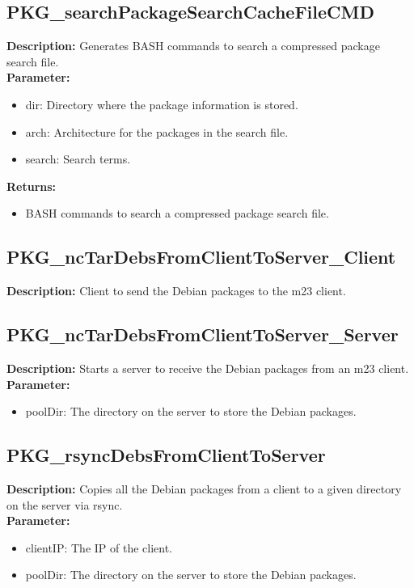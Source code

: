 \subsection{PKG\_searchPackageSearchCacheFileCMD}
\textbf{Description:} Generates BASH commands to search a compressed package search file.\\
\textbf{Parameter:}
\begin{itemize}
\item dir: Directory where the package information is stored.
\item arch: Architecture for the packages in the search file.
\item search: Search terms.
\end{itemize}
\textbf{Returns:}
\begin{itemize}
\item BASH commands to search a compressed package search file.
\end{itemize}

\subsection{PKG\_ncTarDebsFromClientToServer\_Client}
\textbf{Description:} Client to send the Debian packages to the m23 client.\\

\subsection{PKG\_ncTarDebsFromClientToServer\_Server}
\textbf{Description:} Starts a server to receive the Debian packages from an m23 client.\\
\textbf{Parameter:}
\begin{itemize}
\item poolDir: The directory on the server to store the Debian packages.
\end{itemize}

\subsection{PKG\_rsyncDebsFromClientToServer}
\textbf{Description:} Copies all the Debian packages from a client to a given directory on the server via rsync.\\
\textbf{Parameter:}
\begin{itemize}
\item clientIP: The IP of the client.
\item poolDir: The directory on the server to store the Debian packages.
\end{itemize}

